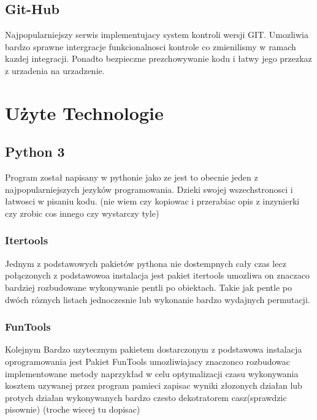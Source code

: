 \documentclass[11pt,a4paper]{article}
\begin{document}
    \subsection{Git-Hub}
        \hspace{1cm} Najpopularniejszy serwis implementujacy system kontroli wersji GIT. Umozliwia bardzo sprawne intergracje funkcionalnosci kontrole co zmienilismy w ramach kazdej integracji. Ponadto bezpieczne prezchowywanie kodu i łatwy jego przezkaz z urzadenia na urzadzenie.

    \section{Użyte Technologie}

    \subsection{Python 3}
    \hspace{1cm} Program został napisany w pythonie jako ze jest to obecnie jeden z najpopularniejszych jezyków programowania. Dzieki swojej wszechstronosci i łatwosci w pisaniu kodu.
    (nie wiem czy kopiowac i przerabiac opis z inzynierki czy zrobic cos innego czy wystarczy tyle)

    \subsubsection{Itertools}
    \hspace{1cm} Jednym z podstawowych pakietów pythona nie dostempnych cały czas lecz połączonych z podstawowoa instalacja jest pakiet itertools umozliwa on znaczaco bardziej rozbudowane wykonywanie pentli po obiektach. Takie jak pentle po dwóch róznych listach jednoczesnie lub wykonanie bardzo wydajnych permutacji.

    \subsubsection{FunTools}
    \hspace{1cm} Kolejnym Bardzo uzytecznym pakietem dostarczonym z podstawowa instalacja oprogramowania jest Pakiet FunTools umozliwiajacy znaczonco rozbudowac implementowane metody naprzykład w celu optymalizacji czasu wykonywania kosztem uzywanej przez program pamieci zapisac wyniki złozonych działan lub protych działan wykonywanych bardzo czesto dekotratorem casz(sprawdzic pisownie) (troche wiecej tu dopisac)
\end{document}
